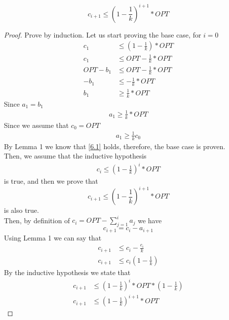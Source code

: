 \documentclass[a4paper,11pt]{article}
\begin{document}
\newpage
\begin{lemma}
	$$c_{i+1} \leq ( 1- \frac{1}{k})^{i+1} * OPT$$
\end{lemma}

\vspace{0.3 cm}

\begin{proof}
	Prove by induction. Let us start proving the base case, for $i=0$
	\begin{align*}
		c_{1} &\leq ( 1- \frac{1}{k}) * OPT\\
		c_{1} &\leq OPT - \frac{1}{k} * OPT\\
		OPT - b_1 &\leq OPT - \frac{1}{k} * OPT\\
		- b_1 &\leq - \frac{1}{k} * OPT\\
		b_1 &\geq  \frac{1}{k} * OPT
	\end{align*}
	Since $a_1=b_1$ 
	\begin{align*}
		a_1 \geq  \frac{1}{k}* OPT
	\end{align*}	
	Since we assume that $c_0=OPT$
	\begin{align}
		a_1 \geq  \frac{1}{k}c_0 \label{6.1}
	\end{align}
	By Lemma 1 we know that \ref{6.1} holds, therefore, the base case is proven.\\
	Then, we assume that the inductive hypothesis
	\begin{align*}
		c_{i} \leq ( 1- \frac{1}{k})^{i} * OPT
	\end{align*}
	is true, and then we prove that 
	$$c_{i+1} \leq ( 1- \frac{1}{k})^{i+1} * OPT$$  
	is also true.
	\\Then, by definition of $ c_i=OPT- \sum\limits_{j=1}^{i} a_j$ we have
	$$c_{i+1} = c_i - a_{i+1}$$
	Using Lemma 1 we can say that
	\begin{align*}
		c_{i+1} &\leq c_i - \frac{c_i}{k}\\
		c_{i+1} &\leq c_i (1- \frac{1}{k})
	\end{align*}
	By the inductive hypothesis we state that
	\begin{align*}
		c_{i+1} &\leq (1- \frac{1}{k})^{i} * OPT * (1- \frac{1}{k})\\
		c_{i+1} &\leq (1- \frac{1}{k})^{i+1} * OPT
	\end{align*}
\end{proof}
\end{document}
